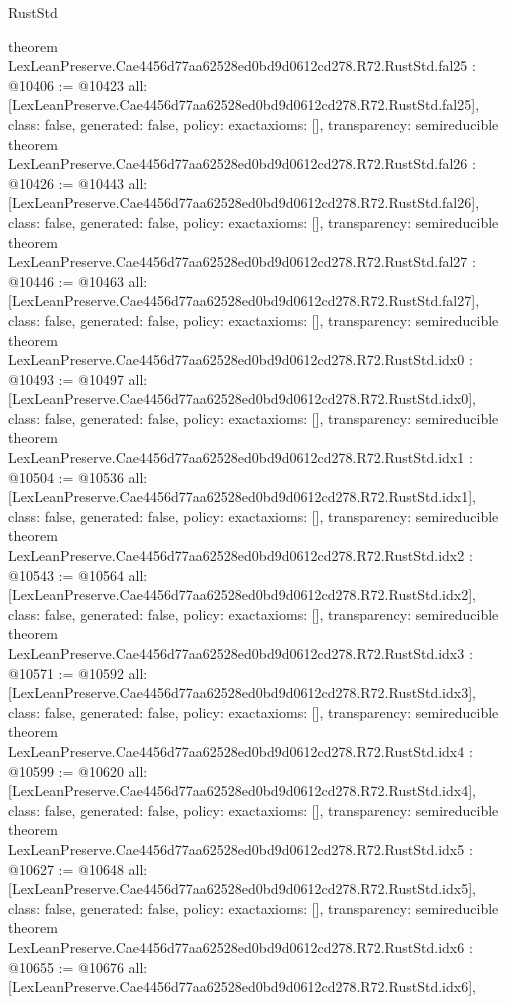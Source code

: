 \begin{lexlean}{RustStd}
\begin{coremodule}
{}
theorem LexLeanPreserve.Cae4456d77aa62528ed0bd9d0612cd278.R72.RustStd.fal25 : @10406 := @10423 {
  all: [LexLeanPreserve.Cae4456d77aa62528ed0bd9d0612cd278.R72.RustStd.fal25],
  class: false,
  generated: false,
  policy: exact{axioms: []},
  transparency: semireducible
}
theorem LexLeanPreserve.Cae4456d77aa62528ed0bd9d0612cd278.R72.RustStd.fal26 : @10426 := @10443 {
  all: [LexLeanPreserve.Cae4456d77aa62528ed0bd9d0612cd278.R72.RustStd.fal26],
  class: false,
  generated: false,
  policy: exact{axioms: []},
  transparency: semireducible
}
theorem LexLeanPreserve.Cae4456d77aa62528ed0bd9d0612cd278.R72.RustStd.fal27 : @10446 := @10463 {
  all: [LexLeanPreserve.Cae4456d77aa62528ed0bd9d0612cd278.R72.RustStd.fal27],
  class: false,
  generated: false,
  policy: exact{axioms: []},
  transparency: semireducible
}
theorem LexLeanPreserve.Cae4456d77aa62528ed0bd9d0612cd278.R72.RustStd.idx0 : @10493 := @10497 {
  all: [LexLeanPreserve.Cae4456d77aa62528ed0bd9d0612cd278.R72.RustStd.idx0],
  class: false,
  generated: false,
  policy: exact{axioms: []},
  transparency: semireducible
}
theorem LexLeanPreserve.Cae4456d77aa62528ed0bd9d0612cd278.R72.RustStd.idx1 : @10504 := @10536 {
  all: [LexLeanPreserve.Cae4456d77aa62528ed0bd9d0612cd278.R72.RustStd.idx1],
  class: false,
  generated: false,
  policy: exact{axioms: []},
  transparency: semireducible
}
theorem LexLeanPreserve.Cae4456d77aa62528ed0bd9d0612cd278.R72.RustStd.idx2 : @10543 := @10564 {
  all: [LexLeanPreserve.Cae4456d77aa62528ed0bd9d0612cd278.R72.RustStd.idx2],
  class: false,
  generated: false,
  policy: exact{axioms: []},
  transparency: semireducible
}
theorem LexLeanPreserve.Cae4456d77aa62528ed0bd9d0612cd278.R72.RustStd.idx3 : @10571 := @10592 {
  all: [LexLeanPreserve.Cae4456d77aa62528ed0bd9d0612cd278.R72.RustStd.idx3],
  class: false,
  generated: false,
  policy: exact{axioms: []},
  transparency: semireducible
}
theorem LexLeanPreserve.Cae4456d77aa62528ed0bd9d0612cd278.R72.RustStd.idx4 : @10599 := @10620 {
  all: [LexLeanPreserve.Cae4456d77aa62528ed0bd9d0612cd278.R72.RustStd.idx4],
  class: false,
  generated: false,
  policy: exact{axioms: []},
  transparency: semireducible
}
theorem LexLeanPreserve.Cae4456d77aa62528ed0bd9d0612cd278.R72.RustStd.idx5 : @10627 := @10648 {
  all: [LexLeanPreserve.Cae4456d77aa62528ed0bd9d0612cd278.R72.RustStd.idx5],
  class: false,
  generated: false,
  policy: exact{axioms: []},
  transparency: semireducible
}
theorem LexLeanPreserve.Cae4456d77aa62528ed0bd9d0612cd278.R72.RustStd.idx6 : @10655 := @10676 {
  all: [LexLeanPreserve.Cae4456d77aa62528ed0bd9d0612cd278.R72.RustStd.idx6],
}
\end{coremodule}
\end{lexlean}
